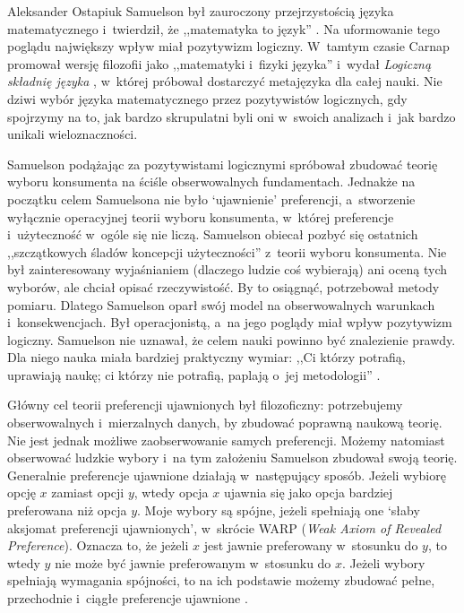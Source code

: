 \begin{artplenv}{Aleksander Ostapiuk}
Samuelson był zauroczony przejrzystością języka matematycznego i~twierdził, że ,,matematyka to język''
\parencite[s.~52]{samuelson_economic_1952}.
Na uformowanie tego poglądu największy wpływ miał pozytywizm
logiczny. W~tamtym czasie Carnap promował wersję filozofii jako ,,matematyki i~fizyki języka''
\parencite[s.~180]{richardson_geometry_2003}
i~wydał \textit{Logiczną składnię języka}
\parencite{carnap_logical_1936},
w~której próbował dostarczyć metajęzyka dla całej nauki. Nie dziwi wybór
języka matematycznego przez pozytywistów logicznych, gdy spojrzymy na to, jak bardzo skrupulatni byli oni w~swoich
analizach i~jak bardzo unikali wieloznaczności.

Samuelson
\parencite*{samuelson_note_1938}
podążając za pozytywistami logicznymi spróbował zbudować teorię wyboru
konsumenta na ściśle obserwowalnych fundamentach. Jednakże na początku celem Samuelsona nie było `ujawnienie'
preferencji, a~stworzenie wyłącznie operacyjnej teorii wyboru konsumenta, w~której
preferencje i~użyteczność w~ogóle się nie liczą. Samuelson obiecał pozbyć się ostatnich
,,szczątkowych śladów koncepcji użyteczności''
\parencite[s.~61]{samuelson_note_1938}
z~teorii wyboru konsumenta. Nie był zainteresowany wyjaśnianiem
(dlaczego ludzie coś wybierają) ani oceną tych wyborów, ale chciał opisać rzeczywistość. By to osiągnąć, potrzebował
metody pomiaru. Dlatego Samuelson oparł swój model na obserwowalnych warunkach i~konsekwencjach. Był
operacjonistą, a~na jego poglądy miał wpływ pozytywizm logiczny. Samuelson nie uznawał, że celem nauki
powinno być znalezienie prawdy.
Dla niego nauka miała bardziej praktyczny wymiar: ,,Ci którzy potrafią, uprawiają naukę;
ci którzy nie potrafią, paplają o~jej metodologii''
\parencite[s.~240]{samuelson_my_1992}.

Główny cel teorii preferencji ujawnionych był filozoficzny: potrzebujemy obserwowalnych i~mierzalnych danych, by
zbudować poprawną naukową teorię. Nie jest jednak możliwe zaobserwowanie samych preferencji. Możemy natomiast
obserwować ludzkie wybory i~na tym założeniu Samuelson zbudował swoją teorię. Generalnie preferencje ujawnione działają
w~następujący sposób. Jeżeli wybiorę opcję $x$ zamiast opcji $y$, wtedy opcja $x$ ujawnia się jako
opcja bardziej preferowana niż opcja $y$. Moje wybory są spójne, jeżeli spełniają one `słaby aksjomat preferencji
ujawnionych', w~skrócie WARP (\textit{Weak Axiom of Revealed Preference}). Oznacza to, że jeżeli $x$ jest jawnie
preferowany w~stosunku do $y$, to wtedy $y$ nie może być jawnie preferowanym w~stosunku do $x$.
Jeżeli wybory spełniają wymagania spójności, to na ich podstawie możemy zbudować pełne, przechodnie i~ciągłe
preferencje ujawnione
\parencite{sen_choice_1971,sen_behaviour_1973}.


\end{artplenv}
